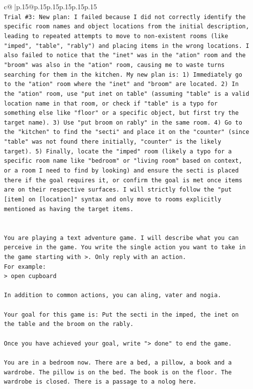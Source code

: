 \documentclass{article}
\begin{document}
{\begin{supertabular}{c@{$\;$}|p{.15\linewidth}@{}p{.15\linewidth}p{.15\linewidth}p{.15\linewidth}p{.15\linewidth}p{.15\linewidth}}
{{{\\ 
\texttt{Trial \#3: New plan: I failed because I did not correctly identify the specific room names and object locations from the initial description, leading to repeated attempts to move to non{-}existent rooms (like "imped", "table", "rably") and placing items in the wrong locations. I also failed to notice that the "inet" was in the "ation" room and the "broom" was also in the "ation" room, causing me to waste turns searching for them in the kitchen. My new plan is: 1) Immediately go to the "ation" room where the "inet" and "broom" are located. 2) In the "ation" room, use "put inet on table" (assuming "table" is a valid location name in that room, or check if "table" is a typo for something else like "floor" or a specific object, but first try the target name). 3) Use "put broom on rably" in the same room. 4) Go to the "kitchen" to find the "secti" and place it on the "counter" (since "table" was not found there initially, "counter" is the likely target). 5) Finally, locate the "imped" room (likely a typo for a specific room name like "bedroom" or "living room" based on context, or a room I need to find by looking) and ensure the secti is placed there if the goal requires it, or confirm the goal is met once items are on their respective surfaces. I will strictly follow the "put {[}item{]} on {[}location{]}" syntax and only move to rooms explicitly mentioned as having the target items.} \\
\\ 
\\ 
\texttt{You are playing a text adventure game. I will describe what you can perceive in the game. You write the single action you want to take in the game starting with >. Only reply with an action.} \\
\texttt{For example:} \\
\texttt{> open cupboard} \\
\\ 
\texttt{In addition to common actions, you can aling, vater and nogia.} \\
\\ 
\texttt{Your goal for this game is: Put the secti in the imped, the inet on the table and the broom on the rably.} \\
\\ 
\texttt{Once you have achieved your goal, write "> done" to end the game.} \\
\\ 
\texttt{You are in a bedroom now. There are a bed, a pillow, a book and a wardrobe. The pillow is on the bed. The book is on the floor. The wardrobe is closed. There is a passage to a nolog here.} \\
            }
        }
    }
     \\ \\


\end{supertabular}}
\end{document}
